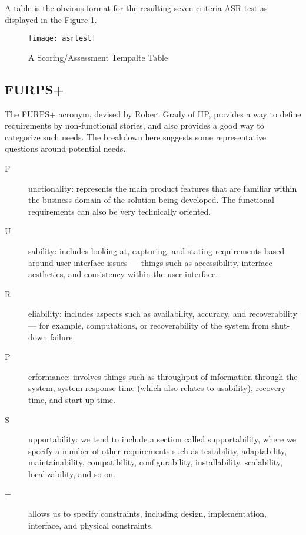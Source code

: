 A table is the obvious format for the resulting seven-criteria ASR test as displayed in the Figure \ref{fig:asrtest}.

\begin{figure}[H]
	\center
	\texttt{[image: asrtest]}
	\caption{A Scoring/Assessment Tempalte Table}
	\label{fig:asrtest}
\end{figure}

\subsection{FURPS+}
The FURPS+ acronym, devised by Robert Grady of HP, provides a way to define requirements by non-functional stories, and also provides a good way to categorize such needs. The breakdown here suggests some representative questions around potential needs.

\begin{description}
	\item [F]unctionality: represents the main product features that are familiar within the business domain of the solution being developed. The functional requirements can also be very technically oriented.
	\item [U]sability: includes looking at, capturing, and stating requirements based around user interface issues — things such as accessibility, interface aesthetics, and consistency within the user interface.
	\item [R]eliability: includes aspects such as availability, accuracy, and recoverability — for example, computations, or recoverability of the system from shut-down failure.
	\item [P]erformance: involves things such as throughput of information through the system, system response time (which also relates to usability), recovery time, and start-up time.
	\item [S]upportability: we tend to include a section called supportability, where we specify a number of other requirements such as testability, adaptability, maintainability, compatibility, configurability, installability, scalability, localizability, and so on.
	\item [+] allows us to specify constraints, including design, implementation, interface, and physical constraints.
\end{description}

